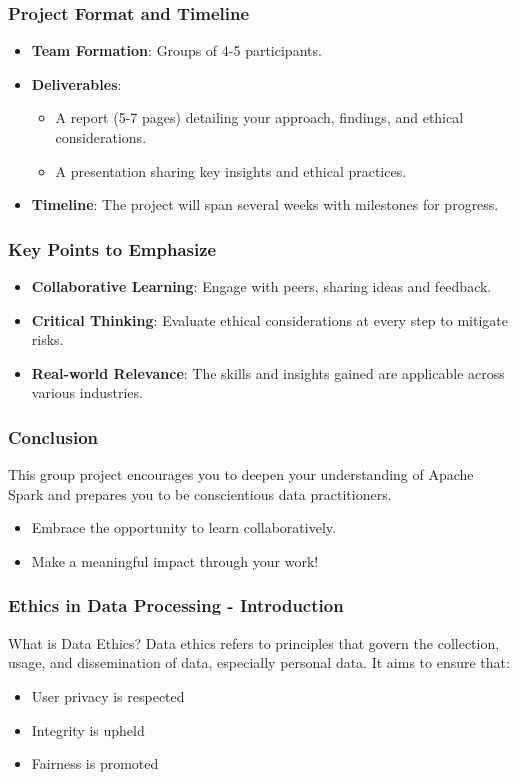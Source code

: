 \documentclass[aspectratio=169]{beamer}
\begin{document}
\begin{frame}[fragile]
    \frametitle{Project Format and Timeline}
    \begin{itemize}
        \item \textbf{Team Formation}: Groups of 4-5 participants.
        \item \textbf{Deliverables}:
            \begin{itemize}
                \item A report (5-7 pages) detailing your approach, findings, and ethical considerations.
                \item A presentation sharing key insights and ethical practices.
            \end{itemize}
        \item \textbf{Timeline}: The project will span several weeks with milestones for progress.
    \end{itemize}
\end{frame}

\begin{frame}[fragile]
    \frametitle{Key Points to Emphasize}
    \begin{itemize}
        \item \textbf{Collaborative Learning}: Engage with peers, sharing ideas and feedback.
        \item \textbf{Critical Thinking}: Evaluate ethical considerations at every step to mitigate risks.
        \item \textbf{Real-world Relevance}: The skills and insights gained are applicable across various industries.
    \end{itemize}
\end{frame}

\begin{frame}[fragile]
    \frametitle{Conclusion}
    This group project encourages you to deepen your understanding of Apache Spark and prepares you to be conscientious data practitioners. 
    \begin{itemize}
        \item Embrace the opportunity to learn collaboratively.
        \item Make a meaningful impact through your work!
    \end{itemize}
\end{frame}

\begin{frame}[fragile]
    \frametitle{Ethics in Data Processing - Introduction}
    \begin{block}{What is Data Ethics?}
        Data ethics refers to principles that govern the collection, usage, and dissemination of data, especially personal data. It aims to ensure that:
    \end{block}
    \begin{itemize}
        \item User privacy is respected
        \item Integrity is upheld
        \item Fairness is promoted
    \end{itemize}
\end{frame}
\end{document}
